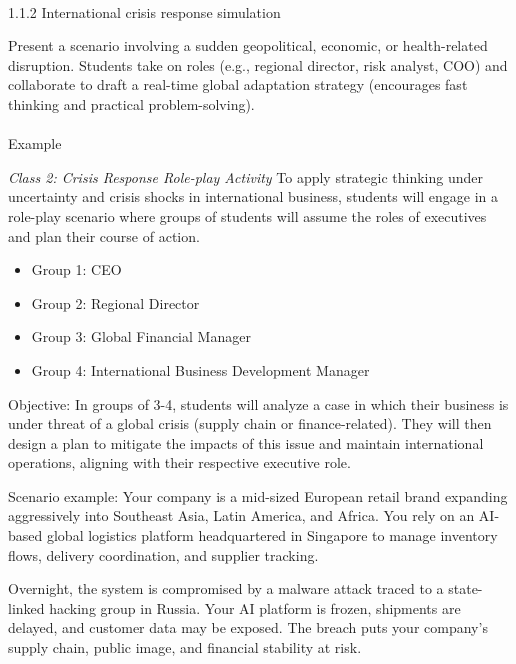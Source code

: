 \documentclass[
  11pt,
]{article}
\makeatletter
\let\oldparagraph\paragraph
\renewcommand{\paragraph}{
    \@ifstar
      \xxxParagraphStar
      \xxxParagraphNoStar
  }
\newcommand{\xxxParagraphStar}[1]{\oldparagraph*{#1}\mbox{}}
\newcommand{\xxxParagraphNoStar}[1]{\oldparagraph{#1}\mbox{}}
\providecommand{\tightlist}{%
  \setlength{\itemsep}{0pt}\setlength{\parskip}{0pt}}
\makeatother
\begin{document}
\paragraph{1.1.2 International crisis response
simulation}\label{international-crisis-response-simulation-1}

Present a scenario involving a sudden geopolitical, economic, or
health-related disruption. Students take on roles (e.g., regional
director, risk analyst, COO) and collaborate to draft a real-time global
adaptation strategy (encourages fast thinking and practical
problem-solving).

\paragraph{Example}\label{example-1}

\emph{Class 2: Crisis Response Role-play Activity} To apply strategic
thinking under uncertainty and crisis shocks in international business,
students will engage in a role-play scenario where groups of students
will assume the roles of executives and plan their course of action.

\begin{itemize}
\tightlist
\item
  Group 1: CEO
\item
  Group 2: Regional Director
\item
  Group 3: Global Financial Manager
\item
  Group 4: International Business Development Manager
\end{itemize}

Objective: In groups of 3-4, students will analyze a case in which their
business is under threat of a global crisis (supply chain or
finance-related). They will then design a plan to mitigate the impacts
of this issue and maintain international operations, aligning with their
respective executive role.

Scenario example: Your company is a mid-sized European retail brand
expanding aggressively into Southeast Asia, Latin America, and Africa.
You rely on an AI-based global logistics platform headquartered in
Singapore to manage inventory flows, delivery coordination, and supplier
tracking.

Overnight, the system is compromised by a malware attack traced to a
state-linked hacking group in Russia. Your AI platform is frozen,
shipments are delayed, and customer data may be exposed. The breach puts
your company's supply chain, public image, and financial stability at
risk.
\end{document}
